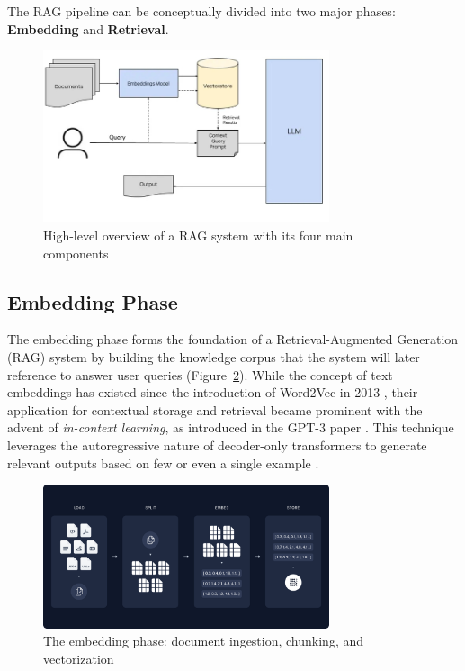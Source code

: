 The RAG pipeline can be conceptually divided into two major phases: \textbf{Embedding} and \textbf{Retrieval}.
\begin{figure}[h]
    \centering
    \includegraphics[width=0.75\textwidth]{images/RAG-pipeline.jpeg}
    \caption{High-level overview of a RAG system with its four main components~\cite{glenn2024mastering}}
    \label{fig:rag_overview}
\end{figure}

\subsection{Embedding Phase}
\label{subsec:EmbeddingPhase}

The embedding phase forms the foundation of a Retrieval-Augmented Generation (RAG) system by building the knowledge corpus that the system will later reference to answer user queries (Figure~\ref{fig:embedding_phase}). While the concept of text embeddings has existed since the introduction of Word2Vec in 2013 \cite{mikolov2013efficient}, their application for contextual storage and retrieval became prominent with the advent of \textit{in-context learning}, as introduced in the GPT-3 paper \cite{brown2020language}. This technique leverages the autoregressive nature of decoder-only transformers to generate relevant outputs based on few or even a single example \cite{bashir2023context}.

\begin{figure}[h]
    \centering
    \includegraphics[width=0.75\textwidth]{images/lagchain-rag-embedding.png}
    \caption{The embedding phase: document ingestion, chunking, and vectorization~\cite{langchain_rag}}
    \label{fig:embedding_phase}
\end{figure}

